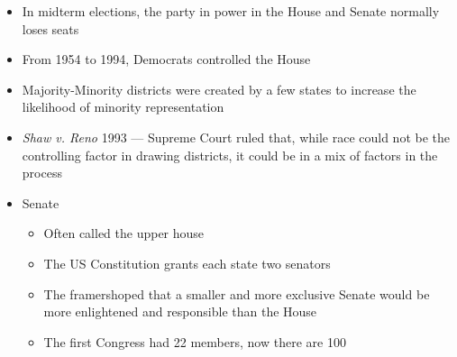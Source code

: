 \documentclass[12pt]{article}
\begin{document}
\begin{itemize}
  \item In midterm elections, the party in power in the House and Senate normally loses seats

  \item From 1954 to 1994, Democrats controlled the House

  \item Majority-Minority districts were created by a few states to increase the likelihood of minority representation

  \item \textit{Shaw v. Reno} 1993 — Supreme Court ruled that, while race could not be the controlling factor in drawing districts, it could be in a mix of factors in the process

  \item Senate

    \begin{itemize}

      \item Often called the upper house

      \item The US Constitution grants each state two senators

      \item The framershoped that a smaller and more exclusive Senate would be more enlightened and responsible than the House

      \item The first Congress had 22 members, now there are 100

    \end{itemize}

\end{itemize}
\end{document}
